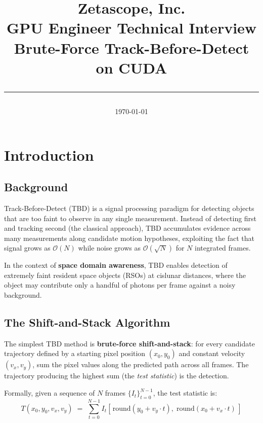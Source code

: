 \documentclass[11pt,letterpaper]{article}
\title{%
    \vspace{-1cm}
    {\Large\textcolor{zetablue}{\textbf{Zetascope, Inc.}}}\\[0.3cm]
    {\LARGE GPU Engineer Technical Interview}\\[0.2cm]
    {\Large Brute-Force Track-Before-Detect on CUDA}\\[0.3cm]
    \rule{\textwidth}{0.4pt}
}
\author{}
\date{\today}
\begin{document}
\maketitle
\thispagestyle{fancy}

\section{Introduction}

\subsection{Background}

Track-Before-Detect (TBD) is a signal processing paradigm for detecting
objects that are too faint to observe in any single measurement. Instead
of detecting first and tracking second (the classical approach), TBD
accumulates evidence across many measurements along candidate motion
hypotheses, exploiting the fact that signal grows as $\mathcal{O}(N)$
while noise grows as $\mathcal{O}(\sqrt{N})$ for $N$ integrated frames.

In the context of \textbf{space domain awareness}, TBD enables detection
of extremely faint resident space objects (RSOs) at cislunar distances,
where the object may contribute only a handful of photons per frame
against a noisy background.

\subsection{The Shift-and-Stack Algorithm}

The simplest TBD method is \textbf{brute-force shift-and-stack}: for every
candidate trajectory defined by a starting pixel position $(x_0, y_0)$ and
constant velocity $(v_x, v_y)$, sum the pixel values along the predicted
path across all frames. The trajectory producing the highest sum (the
\emph{test statistic}) is the detection.

Formally, given a sequence of $N$ frames $\{I_t\}_{t=0}^{N-1}$, the
test statistic is:
\begin{equation}
    \boxed{
    T(x_0, y_0, v_x, v_y)
    \;=\;
    \sum_{t=0}^{N-1} I_t\!\left[\,
        \mathrm{round}(y_0 + v_y \cdot t),\;
        \mathrm{round}(x_0 + v_x \cdot t)
    \,\right]
    }
    \label{eq:test_stat}
\end{equation}
\end{document}
